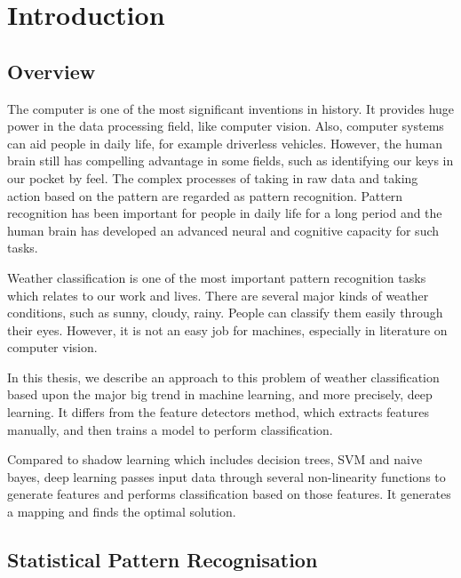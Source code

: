 \chapter{Introduction} %
\label{Chapter1}


\section{Overview}

The computer is one of the most significant inventions in history. It provides huge power in the data processing field, like computer vision. Also, computer systems can aid people in daily life, for example driverless vehicles. However, the human brain still has compelling advantage in some fields, such as identifying our keys in our pocket by feel. The complex processes of taking in raw data and taking action based on the pattern are regarded as pattern recognition. Pattern recognition has been important for people in daily life for a long period and the human brain has developed an advanced neural and cognitive capacity for such tasks.

Weather classification is one of the most important pattern recognition tasks which relates to our work and lives. There are several major kinds of weather conditions, such as sunny, cloudy, rainy. People can classify them easily through their eyes. However, it is not an easy job for machines, especially in literature on computer vision. 

In this thesis, we describe an approach to this problem of weather classification based upon the major big trend in machine learning, and more precisely, deep learning. It differs from the feature detectors method, which extracts features manually, and then trains a model to perform classification.

Compared to shadow learning which includes decision trees, SVM and naive bayes, deep learning passes input data through several non-linearity functions to generate features and performs classification based on those features. It generates a mapping and finds the optimal solution.

\section{Statistical Pattern Recognisation}

